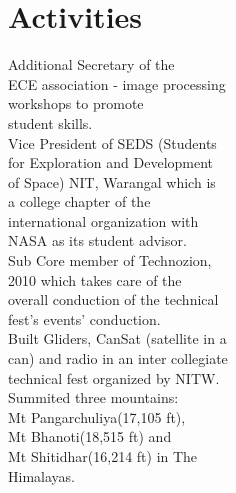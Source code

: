 \documentclass[letterpaper]{deedy-resume} %
\begin{document}
\begin{minipage}[t]{0.23\textwidth}
\section{Activities}
\footnotesize{
\textbullet{} Additional Secretary of the \\ \hphantom{\textbullet{}} ECE association - image processing \\ \hphantom{\textbullet{}} workshops to promote \\ \hphantom{\textbullet{}} student skills.\\
\textbullet{} Vice President of SEDS (Students \\ \hphantom{\textbullet{}} for Exploration and Development \\ \hphantom{\textbullet{}} of Space) NIT, Warangal which is\\ \hphantom{\textbullet{}} a college chapter of the\\ \hphantom{\textbullet{}} international organization with \\ \hphantom{\textbullet{}} NASA as its student advisor.\\
\textbullet{} Sub Core member of Technozion, \\ \hphantom{\textbullet{}} 2010 which takes care of the \\ \hphantom{\textbullet{}} overall conduction of the technical \\ \hphantom{\textbullet{}} fest’s events’ conduction.\\
\textbullet{} Built Gliders, CanSat (satellite in a \\ \hphantom{\textbullet{}} can) and radio in an inter collegiate \\ \hphantom{\textbullet{}} technical fest organized by NITW.\\
\textbullet{} Summited three mountains: \\ \hphantom{\textbullet{}} Mt Pangarchuliya(17,105 ft), \\ \hphantom{\textbullet{}} Mt Bhanoti(18,515 ft) and \\ \hphantom{\textbullet{}} Mt Shitidhar(16,214 ft) in The \\ \hphantom{\textbullet{}} Himalayas.\\
}
\hfill
\end{minipage} %
%
%
\end{document}
